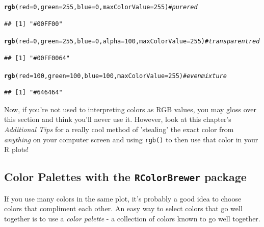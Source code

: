 \documentclass{tufte-book}\usepackage[]{graphicx}\usepackage[]{color}
\makeatletter
\newcommand{\hlnum}[1]{\textcolor[rgb]{0.686,0.059,0.569}{#1}}%
\newcommand{\hlcom}[1]{\textcolor[rgb]{0.678,0.584,0.686}{\textit{#1}}}%
\newcommand{\hlstd}[1]{\textcolor[rgb]{0.345,0.345,0.345}{#1}}%
\newcommand{\hlkwc}[1]{\textcolor[rgb]{0.333,0.667,0.333}{#1}}%
\newcommand{\hlkwd}[1]{\textcolor[rgb]{0.737,0.353,0.396}{\textbf{#1}}}%
\newenvironment{kframe}{%
 \def\at@end@of@kframe{}%
 \ifinner\ifhmode%
  \def\at@end@of@kframe{\end{minipage}}%
  \begin{minipage}{\columnwidth}%
 \fi\fi%
 \def\FrameCommand##1{\hskip\@totalleftmargin \hskip-\fboxsep
 \colorbox{shadecolor}{##1}\hskip-\fboxsep
     \hskip-\linewidth \hskip-\@totalleftmargin \hskip\columnwidth}%
 \MakeFramed {\advance\hsize-\width
   \@totalleftmargin\z@ \linewidth\hsize
   \@setminipage}}%
 {\par\unskip\endMakeFramed%
 \at@end@of@kframe}
\newenvironment{knitrout}{}{} %
\makeatother
\begin{document}
\begin{footnotesize}
\begin{knitrout}
\color{fgcolor}\begin{kframe}
\begin{alltt}
\hlkwd{rgb}\hlstd{(}\hlkwc{red} \hlstd{=} \hlnum{0}\hlstd{,} \hlkwc{green} \hlstd{=} \hlnum{255}\hlstd{,} \hlkwc{blue} \hlstd{=} \hlnum{0}\hlstd{,} \hlkwc{maxColorValue} \hlstd{=} \hlnum{255}\hlstd{)} \hlcom{# pure red}
\end{alltt}
\begin{verbatim}
## [1] "#00FF00"
\end{verbatim}
\begin{alltt}
\hlkwd{rgb}\hlstd{(}\hlkwc{red} \hlstd{=} \hlnum{0}\hlstd{,} \hlkwc{green} \hlstd{=} \hlnum{255}\hlstd{,} \hlkwc{blue} \hlstd{=} \hlnum{0}\hlstd{,} \hlkwc{alpha} \hlstd{=} \hlnum{100}\hlstd{,} \hlkwc{maxColorValue} \hlstd{=} \hlnum{255}\hlstd{)} \hlcom{# transparent red}
\end{alltt}
\begin{verbatim}
## [1] "#00FF0064"
\end{verbatim}
\begin{alltt}
\hlkwd{rgb}\hlstd{(}\hlkwc{red} \hlstd{=} \hlnum{100}\hlstd{,} \hlkwc{green} \hlstd{=} \hlnum{100}\hlstd{,} \hlkwc{blue} \hlstd{=} \hlnum{100}\hlstd{,} \hlkwc{maxColorValue} \hlstd{=} \hlnum{255}\hlstd{)} \hlcom{# even mixture}
\end{alltt}
\begin{verbatim}
## [1] "#646464"
\end{verbatim}
\end{kframe}
\end{knitrout}
\end{footnotesize}

Now, if you're not used to interpreting colors as RGB values, you may gloss over this section and think you'll never use it. However, look at this chapter's \textit{Additional Tips} for a really cool method of 'stealing' the exact color from \textit{anything} on your computer screen and using \texttt{rgb()} to then use that color in your R plots!

\subsection{Color Palettes with the \texttt{RColorBrewer} package}

If you use many colors in the same plot, it's probably a good idea to choose colors that compliment each other. An easy way to select colors that go well together is to use a \textit{color palette} - a collection of colors known to go well together.
\end{document}
